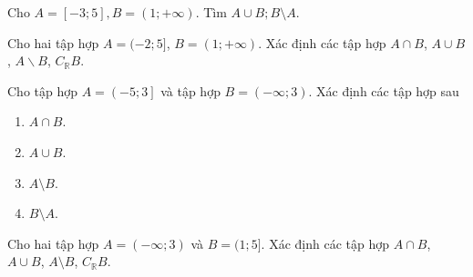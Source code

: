\begin{bt}%
Cho $A=[-3 ; 5], B=(1 ;+\infty)$. Tìm $A \cup B ; B  \setminus A$.
 \loigiai{
 Ta có	$A \cup B = [-3; + \infty)$.\\
$B\setminus A=(5;+\infty)$.	
}
\end{bt}

\begin{bt}%
	Cho hai tập hợp $A=(-2; 5]$, $B=(1;+\infty)$. Xác định các tập hợp $A\cap B$, $A\cup B$, $A\backslash B$, $C_{\mathbb{R}}B$.
	\loigiai{
		Ta có $A\cap B=\left(1;5\right]$, $A\cup B=(-2;+\infty)$, $A\backslash B=(-2;1]$, $C_{\mathbb{R}}B=(-\infty;1]$.
	}
\end{bt}

\begin{bt}%
Cho tập hợp $A=\left(-5;3\right]$ và tập hợp $B=\left(-\infty;3\right)$. Xác định các tập hợp sau
\begin{enumerate}
\item $A\cap B$.
\item $A\cup B$.
\item $A\setminus B$.
\item $B\setminus A$.
\end{enumerate}
\loigiai{
\begin{enumerate}
\item $A\cap B=\left( -5;3\right)$.
\item $A\cup B=\left(-\infty;3\right]$.
\item $A\setminus B=\{3\}$.
\item $B\setminus A=\left(-\infty;-5\right]$.
\end{enumerate}
}
\end{bt}

\begin{bt}%
Cho hai tập hợp $A=(-\infty ;3)$ và $B=(1;5]$. Xác định các tập hợp $A \cap B$, $A \cup B$, $A \setminus B$, $C_\mathbb{R}B.$
\loigiai{\begin{itemize}
\item $A \cap B =(1{,}3).$
\item $A \cup B = (-\infty;5]$.
\item $A \setminus B = (-\infty;1]$.
\item $C_\mathbb{R}B = (-\infty;1] \cup (5;+\infty)$.
\end{itemize}
}
\end{bt}

